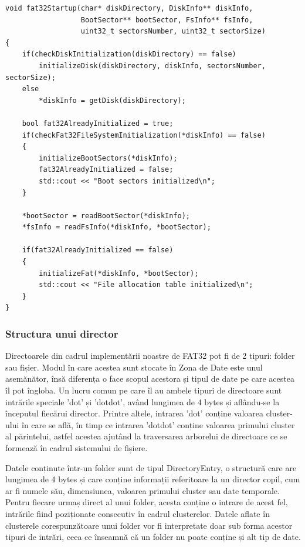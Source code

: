\bigskip

\lstset{style=code-snyppet-style}
\begin{lstlisting}
void fat32Startup(char* diskDirectory, DiskInfo** diskInfo, 
                  BootSector** bootSector, FsInfo** fsInfo, 
                  uint32_t sectorsNumber, uint32_t sectorSize)
{
    if(checkDiskInitialization(diskDirectory) == false)
        initializeDisk(diskDirectory, diskInfo, sectorsNumber, sectorSize);
    else
        *diskInfo = getDisk(diskDirectory);

    bool fat32AlreadyInitialized = true;
    if(checkFat32FileSystemInitialization(*diskInfo) == false)
    {
        initializeBootSectors(*diskInfo);
        fat32AlreadyInitialized = false;
        std::cout << "Boot sectors initialized\n";
    }

    *bootSector = readBootSector(*diskInfo);
    *fsInfo = readFsInfo(*diskInfo, *bootSector);

    if(fat32AlreadyInitialized == false)
    {
        initializeFat(*diskInfo, *bootSector);
        std::cout << "File allocation table initialized\n";
    }
}
\end{lstlisting}

\bigskip

\subsubsection{Structura unui director}

Directoarele din cadrul implementării noastre de FAT32 pot fi de 2 tipuri: folder sau fișier. Modul în care acestea sunt stocate în Zona de Date este unul asemănător, însă diferența o face scopul acestora și tipul de date pe care acestea îl pot îngloba. Un lucru comun pe care îl au ambele tipuri de directoare sunt intrările speciale 'dot' și 'dotdot', având lungimea de 4 bytes și aflându-se la începutul fiecărui director. Printre altele, intrarea 'dot' conține valoarea cluster-ului în care se află, în timp ce intrarea 'dotdot' conține valoarea primului cluster al părintelui, astfel acestea ajutând la traversarea arborelui de directoare ce se formează în cadrul sistemului de fișiere.

Datele conținute într-un folder sunt de tipul DirectoryEntry, o structură care are lungimea de 4 bytes și care conține informații referitoare la un director copil, cum ar fi numele său, dimensiunea, valoarea primului cluster sau date temporale. Pentru fiecare urmaș direct al unui folder, acesta conține o intrare de acest fel, intrările fiind poziționate consecutiv în cadrul clusterelor. Datele aflate în clusterele corespunzătoare unui folder vor fi interpretate doar sub forma acestor tipuri de intrări, ceea ce înseamnă că un folder nu poate conține și alt tip de date.

